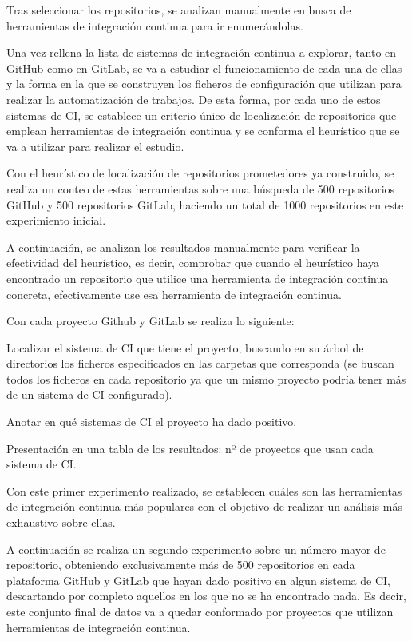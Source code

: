 Tras seleccionar los repositorios, se analizan manualmente en busca de herramientas de integración continua para ir enumerándolas.

Una vez rellena la lista de sistemas de integración continua a explorar, tanto en GitHub como en GitLab, se va a estudiar el funcionamiento de cada una de ellas y la forma en la que se construyen los ficheros de configuración que utilizan para realizar la automatización de trabajos. De esta forma, por cada uno de estos sistemas de CI, se establece un criterio único de localización de repositorios que emplean herramientas de integración continua y se conforma el heurístico que se va a utilizar para realizar el estudio.

Con el heurístico de localización de repositorios prometedores ya construido, se realiza un conteo de estas herramientas sobre una búsqueda de 500 repositorios GitHub y 500 repositorios GitLab, haciendo un total de 1000 repositorios en este experimiento inicial.

A continuación, se analizan los resultados manualmente para verificar la efectividad del heurístico, es decir, comprobar que cuando el heurístico haya encontrado un repositorio que utilice una herramienta de integración continua concreta, efectivamente use esa herramienta de integración continua.

Con cada proyecto Github y GitLab se realiza lo siguiente:
\begin{compactitem}
    \item Localizar el sistema de CI que tiene el proyecto, buscando en su árbol de directorios los ficheros especificados en las carpetas que corresponda (se buscan todos los ficheros en cada repositorio ya que un mismo proyecto podría tener más de un sistema de CI configurado).
    \item Anotar en qué sistemas de CI el proyecto ha dado positivo.
    \item Presentación en una tabla de los resultados: nº de proyectos que usan cada sistema de CI.
\end{compactitem}
	
Con este primer experimento realizado, se establecen cuáles son las herramientas de integración continua más populares con el objetivo de realizar un análisis más exhaustivo sobre ellas.

A continuación se realiza un segundo experimento sobre un número mayor de repositorio, obteniendo exclusivamente más de 500 repositorios en cada plataforma GitHub y  GitLab que hayan dado positivo en algun sistema de CI, descartando por completo aquellos en los que no se ha encontrado nada. Es decir, este conjunto final de datos va a quedar conformado por proyectos que utilizan herramientas de integración continua.

